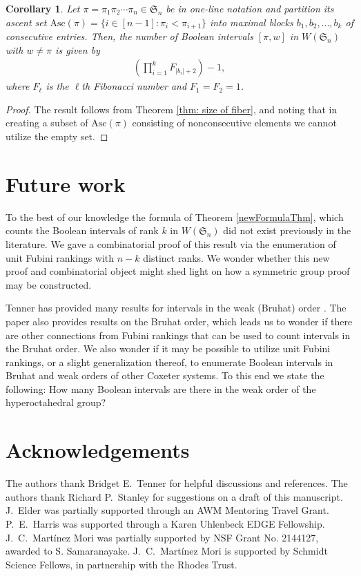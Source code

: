 \documentclass[11pt,reqno]{amsart}
\newcommand{\Asc}{\mathrm{Asc}}
\newcommand{\Sym}{\mathfrak{S}}
\newtheorem{corollary}[rethm]{Corollary}
\begin{document}
\begin{corollary}
    Let $\pi = \pi_1 \pi_2 \cdots \pi_n \in \Sym_{n}$ be in one-line notation and partition its ascent set $\Asc(\pi)=\{i \in [n-1]: \pi_i<\pi_{i+1}\}$ into maximal blocks $b_1, b_2, \ldots, b_k$ of consecutive entries. 
Then, the number of Boolean intervals $[\pi,w]$ in $W(\Sym_n)$ with $w\neq \pi$ is given by
\begin{align*}
    \left(\prod_{i=1}^kF_{|b_i|+2}\right) -1,
\end{align*}
where $F_{\ell}$ is the $\ell$th Fibonacci number and $F_1=F_2 = 1$.

\end{corollary}
\begin{proof}
    The result follows from Theorem \ref{thm: size of fiber}, and noting that in creating a subset of $\Asc(\pi)$ consisting of nonconsecutive elements we cannot utilize the empty set.
\end{proof}




\section{Future work}\label{sec:future}

To the best of our knowledge the formula of Theorem \ref{newFormulaThm}, which counts the Boolean intervals of rank $k$ in $W(\Sym_n)$ did not exist previously in the literature. 
We gave a combinatorial proof of this result via the enumeration of unit Fubini rankings with $n-k$ distinct ranks. 
We wonder whether this new proof and combinatorial object might shed light on how a symmetric group proof may be constructed.

Tenner has provided many results for intervals in the weak (Bruhat) order \cite{tenner2022interval}. 
The paper also provides results on the Bruhat order, which leads us to wonder if there are other connections from Fubini rankings that can be used to count intervals in the Bruhat order.
We also wonder if it may be possible to utilize unit Fubini rankings, or a slight generalization thereof, to enumerate Boolean intervals in Bruhat and weak orders of other Coxeter systems. To this end we state the following: 
How many Boolean intervals are there in the weak order of the hyperoctahedral group?


\section*{Acknowledgements}
The authors thank Bridget E.~Tenner for helpful discussions and references. 
The authors thank Richard P.~Stanley for suggestions on a draft of this manuscript.
J.~Elder was partially supported through an AWM Mentoring Travel Grant. 
P.~E.~Harris was supported through a Karen Uhlenbeck EDGE Fellowship.
J.~C.~Mart\'inez Mori was partially supported by NSF Grant No. 2144127, awarded to S. Samaranayake. 
J.~C.~Mart\'inez Mori is supported by Schmidt Science Fellows, in partnership with the Rhodes Trust.




\end{document}

